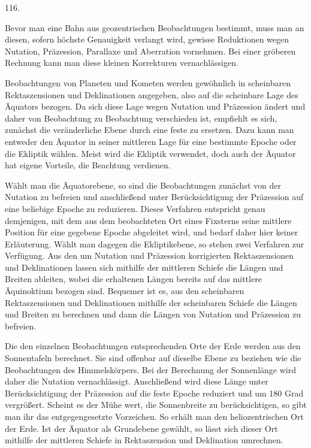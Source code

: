 \par\medskip
\begin{center}\hypertarget{native-163-article116}{}116.\end{center}
Bevor man eine Bahn aus geozentrischen Beobachtungen bestimmt, muss man an diesen, sofern höchste Genauigkeit verlangt wird, gewisse Reduktionen wegen Nutation, Präzession, Parallaxe und Aberration vornehmen. Bei einer gröberen Rechnung kann man diese kleinen Korrekturen vernachlässigen.

Beobachtungen von Planeten und Kometen werden gewöhnlich in scheinbaren Rektaszensionen und Deklinationen angegeben, also auf die scheinbare Lage des Äquators bezogen. Da sich diese Lage wegen Nutation und Präzession ändert und daher von Beobachtung zu Beobachtung verschieden ist, empfiehlt es sich, zunächst die veränderliche Ebene durch eine feste zu ersetzen. Dazu kann man entweder den Äquator in seiner mittleren Lage für eine bestimmte Epoche oder die Ekliptik wählen. Meist wird die Ekliptik verwendet, doch auch der Äquator hat eigene Vorteile, die Beachtung verdienen.

Wählt man die Äquatorebene, so sind die Beobachtungen zunächst von der Nutation zu befreien und anschließend unter Berücksichtigung der Präzession auf eine beliebige Epoche zu reduzieren. Dieses Verfahren entspricht genau demjenigen, mit dem aus dem beobachteten Ort eines Fixsterns seine mittlere Position für eine gegebene Epoche abgeleitet wird, und bedarf daher hier keiner Erläuterung. Wählt man dagegen die Ekliptikebene, so stehen zwei Verfahren zur Verfügung. Aus den um Nutation und Präzession korrigierten Rektaszensionen und Deklinationen lassen sich mithilfe der mittleren Schiefe die Längen und Breiten ableiten, wobei die erhaltenen Längen bereits auf das mittlere Äquinoktium bezogen sind. Bequemer ist es, aus den scheinbaren Rektaszensionen und Deklinationen mithilfe der scheinbaren Schiefe die Längen und Breiten zu berechnen und dann die Längen von Nutation und Präzession zu befreien.

Die den einzelnen Beobachtungen entsprechenden Orte der Erde werden aus den Sonnentafeln berechnet. Sie sind offenbar auf dieselbe Ebene zu beziehen wie die Beobachtungen des Himmelskörpers. Bei der Berechnung der Sonnenlänge wird daher die Nutation vernachlässigt. Anschließend wird diese Länge unter Berücksichtigung der Präzession auf die feste Epoche reduziert und um 180 Grad vergrößert. Scheint es der Mühe wert, die Sonnenbreite zu berücksichtigen, so gibt man ihr das entgegengesetzte Vorzeichen. So erhält man den heliozentrischen Ort der Erde. Ist der Äquator als Grundebene gewählt, so lässt sich dieser Ort mithilfe der mittleren Schiefe in Rektaszension und Deklination umrechnen.
